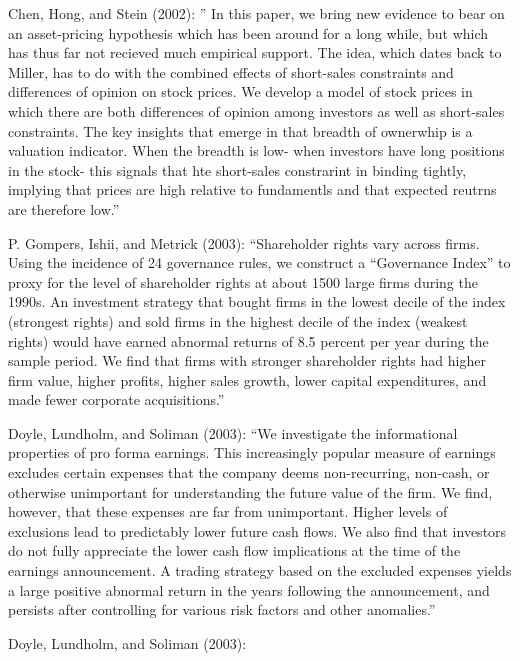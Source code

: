 \documentclass[
  letterpaper,
  DIV=11,
  numbers=noendperiod]{scrreprt}
\begin{document}
Chen, Hong, and Stein (2002): '' In this paper, we bring new evidence to
bear on an asset-pricing hypothesis which has been around for a long
while, but which has thus far not recieved much empirical support. The
idea, which dates back to Miller, has to do with the combined effects of
short-sales constraints and differences of opinion on stock prices. We
develop a model of stock prices in which there are both differences of
opinion among investors as well as short-sales constraints. The key
insights that emerge in that breadth of ownerwhip is a valuation
indicator. When the breadth is low- when investors have long positions
in the stock- this signals that hte short-sales constrarint in binding
tightly, implying that prices are high relative to fundamentls and that
expected reutrns are therefore low.''

P. Gompers, Ishii, and Metrick (2003): ``Shareholder rights vary across
firms. Using the incidence of 24 governance rules, we construct a
``Governance Index'' to proxy for the level of shareholder rights at
about 1500 large firms during the 1990s. An investment strategy that
bought firms in the lowest decile of the index (strongest rights) and
sold firms in the highest decile of the index (weakest rights) would
have earned abnormal returns of 8.5 percent per year during the sample
period. We find that firms with stronger shareholder rights had higher
firm value, higher profits, higher sales growth, lower capital
expenditures, and made fewer corporate acquisitions.''

Doyle, Lundholm, and Soliman (2003): ``We investigate the informational
properties of pro forma earnings. This increasingly popular measure of
earnings excludes certain expenses that the company deems non-recurring,
non-cash, or otherwise unimportant for understanding the future value of
the firm. We find, however, that these expenses are far from
unimportant. Higher levels of exclusions lead to predictably lower
future cash flows. We also find that investors do not fully appreciate
the lower cash flow implications at the time of the earnings
announcement. A trading strategy based on the excluded expenses yields a
large positive abnormal return in the years following the announcement,
and persists after controlling for various risk factors and other
anomalies.''

Doyle, Lundholm, and Soliman (2003):
\end{document}
